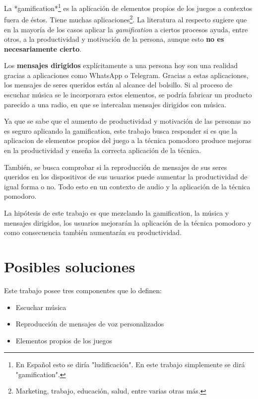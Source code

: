 \documentclass[12pt,letterpaper]{report}
\providecommand{\tightlist}{%
  \setlength{\itemsep}{0pt}\setlength{\parskip}{0pt}}
\begin{document}
La *gamification*\footnote{En Español esto se diría "ludificación". En
  este trabajo simplemente se dirá "gamification".}\cite{deterding2011gamification} es la aplicación de
elementos propios de los juegos a contextos fuera de éstos. Tiene muchas
aplicaciones\footnote{Marketing, trabajo, educación, salud, entre
  varias otras más.}. La literatura al respecto
sugiere que en la mayoría de los casos aplicar la \emph{gamification} a
ciertos procesos ayuda, entre otros, a la productividad y motivación de
la persona, aunque esto \textbf{no es necesariamente
cierto}\cite{hamari2014gamification}.

Los \textbf{mensajes dirigidos} explícitamente a una persona hoy son una
realidad gracias a aplicaciones como WhatsApp o Telegram. Gracias a
estas aplicaciones, los mensajes de seres queridos están al alcance del
bolsillo. Si al proceso de escuchar música se le incorporara estos
elementos, se podría fabricar un producto parecido a una radio, en que
se intercalan mensajes dirigidos con música.

Ya que se sabe que el aumento de productividad y motivación de las
personas no es seguro aplicando la gamification, este trabajo busca
responder si es que la aplicacion de elementos propios del juego a la
técnica pomodoro produce mejoras en la productividad y enseña la
correcta aplicación de la técnica.

También, se busca comprobar si la reproducción de mensajes de sus seres
queridos en los dispositivos de sus usuarios puede aumentar la
productividad de igual forma o no. Todo esto en un contexto de audio y
la aplicación de la técnica pomodoro.

La hipótesis de este trabajo es que mezclando la gamification, la música
y mensajes dirigidos, los usuarios mejorarán la aplicación de la técnica
pomodoro y como consecuencia también aumentarán su productividad.

\newpage
\hypertarget{posibles-soluciones}{%
\section{Posibles soluciones}\label{posibles-soluciones}}

Este trabajo posee tres componentes que lo definen:

\begin{itemize}
\tightlist
\item
  Escuchar música
\item
  Reproducción de mensajes de voz personalizados
\item
  Elementos propios de los juegos
\end{itemize}
\end{document}
